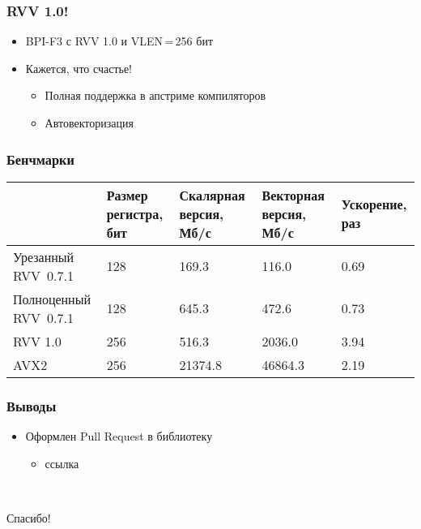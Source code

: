 \documentclass[
    aspectratio=169,
]{beamer}
\begin{document}
\begin{frame}
    \frametitle{RVV 1.0!}

    \begin{itemize}
        \item BPI-F3 с RVV 1.0 и VLEN\,=\,256 бит
        \item Кажется, что счастье!
              \begin{itemize}
                  \item Полная поддержка в апстриме компиляторов
                  \item Автовекторизация
              \end{itemize}
    \end{itemize}

\end{frame}

\begin{frame}
    \frametitle{Бенчмарки}

    \begin{center}
        \begin{tabularx}{\textwidth}{YZZZZ}
            \toprule
                                  & Размер регистра, бит & Скалярная версия, Мб/с & Векторная версия, Мб/с & Ускорение, раз \\
            \midrule
            Урезанный RVV~0.7.1   & 128                  & 169.3                  & 116.0                  & 0.69           \\
            \midrule
            Полноценный RVV~0.7.1 & 128                  & 645.3                  & 472.6                  & 0.73           \\
            \midrule
            RVV 1.0               & 256                  & 516.3                  & 2036.0                 & 3.94           \\
            \midrule
            AVX2                  & 256                  & 21374.8                & 46864.3                & 2.19           \\
            \bottomrule
        \end{tabularx}
    \end{center}

\end{frame}

\begin{frame}
    \frametitle{Выводы}

    \begin{itemize}
        \item Оформлен Pull Request в библиотеку
              \begin{itemize}
                  \item ссылка
              \end{itemize}
    \end{itemize}

    \ %

    \begin{center}
        \Huge  Спасибо!
    \end{center}
\end{frame}
\end{document}
